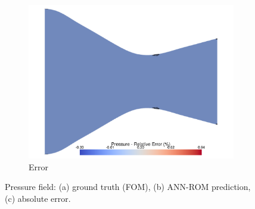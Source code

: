 \documentclass[tg, EN]{ufabcFHZh_tg}
\begin{document}
\begin{figure}[H]
\begin{subfigure}[b]{0.32\textwidth}
        \includegraphics[width=\textwidth]{Figuras/nn_error_pressure.pdf}
        \caption{Error}
    \end{subfigure}
    \caption{Pressure field: (a) ground truth (FOM), (b) ANN-ROM prediction, (c) absolute error.}
    \label{fig:nn_reconstruction_pressure}
\end{figure}
\end{document}
